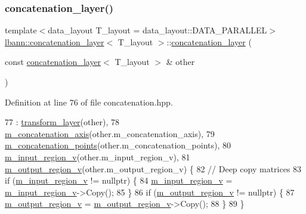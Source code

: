 \subsubsection{\texorpdfstring{concatenation\+\_\+layer()}{concatenation\_layer()}\hspace{0.1cm}{\footnotesize\ttfamily [2/2]}}
{\footnotesize\ttfamily template$<$data\+\_\+layout T\+\_\+layout = data\+\_\+layout\+::\+D\+A\+T\+A\+\_\+\+P\+A\+R\+A\+L\+L\+EL$>$ \\
\hyperlink{classlbann_1_1concatenation__layer}{lbann\+::concatenation\+\_\+layer}$<$ T\+\_\+layout $>$\+::\hyperlink{classlbann_1_1concatenation__layer}{concatenation\+\_\+layer} (\begin{DoxyParamCaption}\item[{const \hyperlink{classlbann_1_1concatenation__layer}{concatenation\+\_\+layer}$<$ T\+\_\+layout $>$ \&}]{other }\end{DoxyParamCaption})\hspace{0.3cm}{\ttfamily [inline]}}



Definition at line 76 of file concatenation.\+hpp.


\begin{DoxyCode}
77     : \hyperlink{classlbann_1_1transform__layer_a4b72501e0f4d0745c8b13c5331055e65}{transform\_layer}(other),
78       \hyperlink{classlbann_1_1concatenation__layer_a4ac4a931dc85d622e9ea8fddb9625d38}{m\_concatenation\_axis}(other.m\_concatenation\_axis),
79       \hyperlink{classlbann_1_1concatenation__layer_a363324fe6cd104740334f3396085328c}{m\_concatenation\_points}(other.m\_concatenation\_points),
80       \hyperlink{classlbann_1_1concatenation__layer_afa68f2e5d3ea2de57f4974a37c01fc7b}{m\_input\_region\_v}(other.m\_input\_region\_v),
81       \hyperlink{classlbann_1_1concatenation__layer_af141bf9cf1569121a65a68e4ae97855c}{m\_output\_region\_v}(other.m\_output\_region\_v) \{
82     \textcolor{comment}{// Deep copy matrices}
83     \textcolor{keywordflow}{if} (\hyperlink{classlbann_1_1concatenation__layer_afa68f2e5d3ea2de57f4974a37c01fc7b}{m\_input\_region\_v} != \textcolor{keyword}{nullptr}) \{
84       \hyperlink{classlbann_1_1concatenation__layer_afa68f2e5d3ea2de57f4974a37c01fc7b}{m\_input\_region\_v} = \hyperlink{classlbann_1_1concatenation__layer_afa68f2e5d3ea2de57f4974a37c01fc7b}{m\_input\_region\_v}->Copy();
85     \}
86     \textcolor{keywordflow}{if} (\hyperlink{classlbann_1_1concatenation__layer_af141bf9cf1569121a65a68e4ae97855c}{m\_output\_region\_v} != \textcolor{keyword}{nullptr}) \{
87       \hyperlink{classlbann_1_1concatenation__layer_af141bf9cf1569121a65a68e4ae97855c}{m\_output\_region\_v} = \hyperlink{classlbann_1_1concatenation__layer_af141bf9cf1569121a65a68e4ae97855c}{m\_output\_region\_v}->Copy();
88     \}
89   \}
\end{DoxyCode}
\mbox{\label{classlbann_1_1concatenation__layer_a5c2b47a4e494ba1fe20f4ec956f981e1}} 
